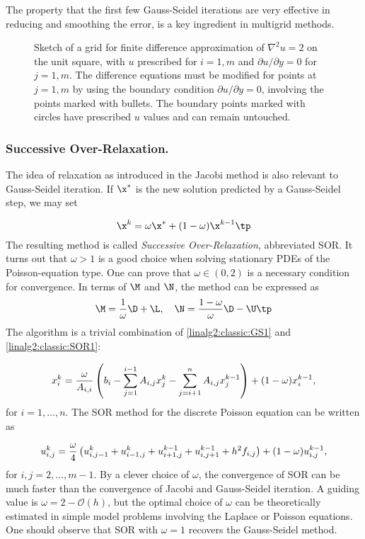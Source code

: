 The property that the first few Gauss-Seidel iterations are
very effective in reducing and smoothing the error,
is a key ingredient in multigrid methods.


\begin{figure}[htb]
  \centerline{}
  \caption{Sketch of a grid for finite difference approximation of
  $\nabla^2u=2$ on the unit square, with $u$ prescribed for $i=1,m$
  and $\partial u /\partial y=0$ for $j=1,m$.
  The difference equations must be modified for points at $j=1,m$ by
  using the boundary condition $\partial u/\partial y=0$,
  involving the points marked
  with bullets. The boundary points marked with circles have
  prescribed $u$ values and can remain untouched.
  \label{ch:linalg:figGS} }
\end{figure}



\subsubsection{Successive Over-Relaxation.}
The idea of relaxation as introduced in the Jacobi method is also
relevant to Gauss-Seidel iteration.
If $\x^*$ is the new solution predicted by a Gauss-Seidel step,
we may set

\begin{equation}
\x^{k} = \omega\x^* + (1-\omega )\x^{k-1}\tp
\label{linalg2:classic:SOR1}
\end{equation}
The resulting method is called \emph{Successive Over-Relaxation},
abbreviated SOR.
It turns out that
$\omega >1$ is a good choice when solving stationary PDEs of the
Poisson-equation type.
One can prove that $\omega\in (0,2)$ is a necessary condition for
convergence.
In terms of $\M$ and $\N$, the method can be expressed as
\[ \M = {1\over\omega }\D +  \L,\quad \N = {1-\omega \over\omega}\D - \U \tp\]
The algorithm is a trivial combination of
\eqref{linalg2:classic:GS1} and \eqref{linalg2:classic:SOR1}:

\begin{equation}
\label{linalg2:classic:SOR2}
x_i^{k} =  {\omega\over A_{i,i}}\left( b_i -\sum_{j=1}^{i-1}A_{i,j}x_j^{k}
- \sum_{j=i+1}^n A_{i,j}x_j^{k-1}\right) + (1-\omega )x_i^{k-1} ,
\end{equation}
for $i=1,\ldots,n$.
The SOR method for the discrete Poisson equation can be written as

\begin{equation}
u^{k}_{i,j} = {\omega \over4}\left(
u^{k}_{i,j-1} + u^{k}_{i-1,j} + u^{k-1}_{i+1,j} + u^{k-1}_{i,j+1}
+ h^2f_{i,j}\right) + (1-\omega )u_{i,j}^{k-1},
\label{linalg2:classic:SOR3}
\end{equation}
for $i,j=2,\ldots,m-1$.
By a clever choice of $\omega$, the convergence of SOR can be much faster
than the convergence of Jacobi and Gauss-Seidel iteration.
A guiding value is $\omega = 2-\mathcal{O}(h)$, but the optimal choice of
$\omega$ can be theoretically estimated in simple model problems involving
the Laplace or Poisson equations.
One should observe that SOR with $\omega =1$ recovers the Gauss-Seidel method.

